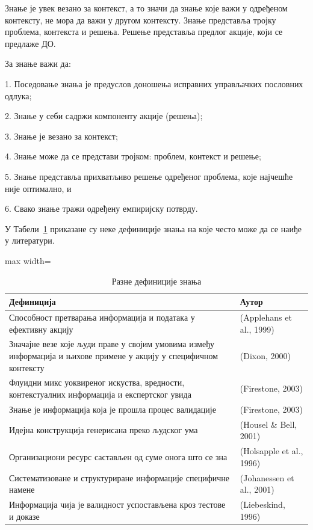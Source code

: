 Знање је увек везано за контекст, а то значи да знање које важи у одређеном контексту, не мора да важи у другом контексту. Знање представља тројку проблема, контекста и решења. Решење представља предлог акције, који се предлаже ДО.

За знање важи да:

1. Поседовање знања је предуслов доношења исправних управљачких пословних одлука;

2. Знање у себи садржи компоненту акције (решења);

3. Знање је везано за контекст;

4. Знање може да се представи тројком: проблем, контекст и решење;

5. Знање представља прихватљиво решење одређеног проблема, које најчешће није оптимално, и

6. Свако знање тражи одређену емпиријску потврду.

У Табели~\ref{tab:01-3} приказане су неке дефиниције знања на које често може да се наиђе у литератури.

\begin{table}[h]
\centering
\begin{adjustbox}{max width=\textwidth}
\begin{tabular}{|l|l|}
\hline
\textbf{Дефиниција} & \textbf{Аутор} \\
\hline
Способност претварања информација и података у ефективну акцију & (Applehans et al., 1999) \\
\hline
Значајне везе које људи праве у својим умовима између информација и њихове примене у акцију у специфичном контексту & (Dixon, 2000) \\
\hline
Флуидни микс уоквиреног искуства, вредности, контекстуалних информација и експертског увида & (Firestone, 2003) \\
\hline
Знање је информација која је прошла процес валидације & (Firestone, 2003) \\
\hline
Идејна конструкција генерисана преко људског ума & (Housel \& Bell, 2001) \\
\hline
Организациони ресурс састављен од суме онога што се зна & (Holsapple et al., 1996) \\
\hline
Систематизоване и структуриране информације специфичне намене & (Johanessen et al., 2001) \\
\hline
Информација чија је валидност успостављена кроз тестове и доказе & (Liebeskind, 1996) \\
\hline
\end{tabular}
\end{adjustbox}
    \caption{Разне дефиниције знања}
    \label{tab:01-3}
\end{table}

